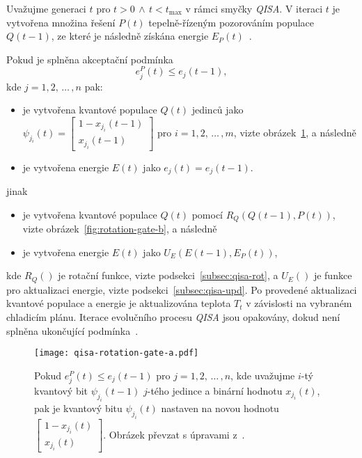 Uvažujme generaci $t$ pro $t>0\,\wedge\,t < t_{\text{max}}$ v rámci smyčky \emph{QISA}. 
V iteraci $t$ je vytvořena množina řešení $P\left(t\right)$ tepelně-řízeným pozorováním populace $Q\left(t-1\right)$, ze které je následně získána energie $E_P\left(t\right)$~\cite{qisa}.

Pokud je splněna akceptační podmínka
\begin{equation}\label{eq:qisa-if}
    e^P_j\left(t\right) \leq e_j\left(t-1\right),
\end{equation}
kde $j = 1,2,\,\dots\,,n$ pak:
\begin{itemize}
    \item je vytvořena kvantové populace $Q\left(t\right)$ jedinců jako $\psi_{j_i}\left(t\right) = \begin{bmatrix} 1 - x_{j_i}\left(t-1\right) \\ x_{j_i}\left(t-1\right) \end{bmatrix}$ pro $i=1,2,\,\dots\,,m$, vizte obrázek~\ref{fig:rotation-gate-a}, a následně
    \item je vytvořena energie $E\left(t\right)$ jako $e_j\left(t\right) = e_j\left(t-1\right)$.
\end{itemize}
jinak
\begin{itemize}
    \item je vytvořena kvantové populace $Q\left(t\right)$ pomocí $R_Q\left(Q\left(t-1\right), P\left(t\right) \right)$, vizte obrázek~\ref{fig:rotation-gate-b}, a následně
    \item je vytvořena energie $E\left(t\right)$ jako $U_E\left(E\left(t-1\right), E_P\left(t\right)\right)$,
\end{itemize}
kde $R_Q\left(\right)$ je rotační funkce, vizte podsekci~\ref{subsec:qisa-rot}, a $U_E\left(\right)$ je funkce pro aktualizaci energie, vizte podsekci~\ref{subsec:qisa-upd}.
Po provedené aktualizaci kvantové populace a energie je aktualizována teplota $T_t$ v závislosti na vybraném chladicím plánu. 
Iterace evolučního procesu \emph{QISA} jsou opakovány, dokud není splněna ukončující podmínka~\cite{qisa}.
\begin{figure}[ht!]
    \centering
    \texttt{[image: qisa-rotation-gate-a.pdf]}
    \caption{Pokud $e^P_j\left(t\right) \leq e_j\left(t-1\right)$ pro $j = 1,2,\,\dots\,,n$, kde uvažujme $i$-tý kvantový bit $\psi_{j_i}\left(t-1\right)$ $j$-tého jedince a binární hodnotu $x_{j_i} \left(t\right)$, pak je kvantový bitu $\psi_{j_i}\left(t\right)$ nastaven na novou hodnotu $\begin{bmatrix} 1 - x_{j_i}\left(t\right) \\ x_{j_i}\left(t\right) \end{bmatrix}$. Obrázek převzat s úpravami z~\cite{qisa}.}
    \label{fig:rotation-gate-a}
\end{figure}

